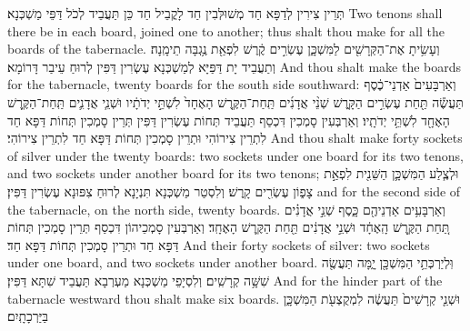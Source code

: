{תְּרֵין צִירִין לְדַפָּא חַד מְשׁוּלְּבִין חַד לָקֳבֵיל חַד כֵּן תַּעֲבֵיד לְכֹל דַּפֵּי מַשְׁכְּנָא׃}
{Two tenons shall there be in each board, joined one to another; thus shalt thou make for all the boards of the tabernacle.}{}
{וְעָשִׂ֥יתָ אֶת־הַקְּרָשִׁ֖ים לַמִּשְׁכָּ֑ן עֶשְׂרִ֣ים קֶ֔רֶשׁ לִפְאַ֖ת נֶ֥גְבָּה תֵימָֽנָה׃
}
{וְתַעֲבֵיד יָת דַּפַּיָּא לְמַשְׁכְּנָא עֶשְׂרִין דַּפִּין לְרוּחַ עֵיבַר דָּרוֹמָא׃}
{And thou shalt make the boards for the tabernacle, twenty boards for the south side southward:}{}
{וְאַרְבָּעִים֙ אַדְנֵי־כֶ֔סֶף תַּעֲשֶׂ֕ה תַּ֖חַת עֶשְׂרִ֣ים הַקָּ֑רֶשׁ שְׁנֵ֨י אֲדָנִ֜ים תַּֽחַת־הַקֶּ֤רֶשׁ הָאֶחָד֙ לִשְׁתֵּ֣י יְדֹתָ֔יו וּשְׁנֵ֧י אֲדָנִ֛ים תַּֽחַת־הַקֶּ֥רֶשׁ הָאֶחָ֖ד לִשְׁתֵּ֥י יְדֹתָֽיו׃}
{וְאַרְבְּעִין סָמְכִין דִּכְסַף תַּעֲבֵיד תְּחוֹת עֶשְׂרִין דַּפִּין תְּרֵין סָמְכִין תְּחוֹת דַּפָּא חַד לִתְרֵין צִירוֹהִי וּתְרֵין סָמְכִין תְּחוֹת דַּפָּא חַד לִתְרֵין צִירוֹהִי׃}
{And thou shalt make forty sockets of silver under the twenty boards: two sockets under one board for its two tenons, and two sockets under another board for its two tenons;}{}
{וּלְצֶ֧לַע הַמִּשְׁכָּ֛ן הַשֵּׁנִ֖ית לִפְאַ֣ת צָפ֑וֹן עֶשְׂרִ֖ים קָֽרֶשׁ׃}
{וְלִסְטַר מַשְׁכְּנָא תִּנְיָנָא לְרוּחַ צִפּוּנָא עֶשְׂרִין דַּפִּין׃}
{and for the second side of the tabernacle, on the north side, twenty boards.}{}
{וְאַרְבָּעִ֥ים אַדְנֵיהֶ֖ם כָּ֑סֶף שְׁנֵ֣י אֲדָנִ֗ים תַּ֚חַת הַקֶּ֣רֶשׁ הָֽאֶחָ֔ד וּשְׁנֵ֣י אֲדָנִ֔ים תַּ֖חַת הַקֶּ֥רֶשׁ הָאֶחָֽד׃}
{וְאַרְבְּעִין סָמְכֵיהוֹן דִּכְסַף תְּרֵין סָמְכִין תְּחוֹת דַּפָּא חַד וּתְרֵין סָמְכִין תְּחוֹת דַּפָּא חַד׃}
{And their forty sockets of silver: two sockets under one board, and two sockets under another board.}{}
{וּֽלְיַרְכְּתֵ֥י הַמִּשְׁכָּ֖ן יָ֑מָּה תַּעֲשֶׂ֖ה שִׁשָּׁ֥ה קְרָשִֽׁים׃
}
{וְלִסְיָפֵי מַשְׁכְּנָא מַעְרְבָא תַּעֲבֵיד שִׁתָּא דַּפִּין׃}
{And for the hinder part of the tabernacle westward thou shalt make six boards.}{}
{וּשְׁנֵ֤י קְרָשִׁים֙ תַּעֲשֶׂ֔ה לִמְקֻצְעֹ֖ת הַמִּשְׁכָּ֑ן בַּיַּרְכָתָֽיִם׃
}
